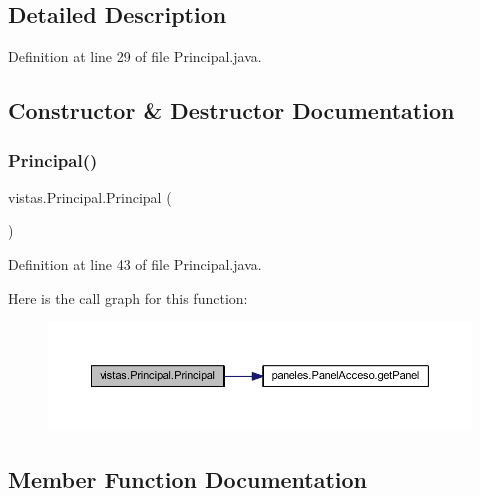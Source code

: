 \subsection{Detailed Description}


Definition at line 29 of file Principal.\+java.



\subsection{Constructor \& Destructor Documentation}
\mbox{\label{classvistas_1_1_principal_acf014fac1f15c33d980e722fe1e6d58f}} 
\subsubsection{\texorpdfstring{Principal()}{Principal()}}
{\footnotesize\ttfamily vistas.\+Principal.\+Principal (\begin{DoxyParamCaption}{ }\end{DoxyParamCaption})}



Definition at line 43 of file Principal.\+java.

Here is the call graph for this function\+:\nopagebreak
\begin{figure}[H]
\begin{center}
\leavevmode
\includegraphics[width=350pt]{classvistas_1_1_principal_acf014fac1f15c33d980e722fe1e6d58f_cgraph}
\end{center}
\end{figure}


\subsection{Member Function Documentation}
\mbox{\label{classvistas_1_1_principal_a0f01204c3cdf3b88718a5f2c6a6d9ac9}} 
